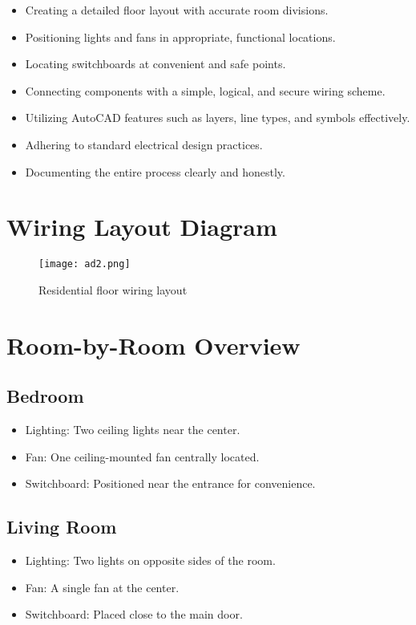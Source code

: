 \documentclass[12pt]{article}
\begin{document}
\begin{itemize}
    \item Creating a detailed floor layout with accurate room divisions.
    \item Positioning lights and fans in appropriate, functional locations.
    \item Locating switchboards at convenient and safe points.
    \item Connecting components with a simple, logical, and secure wiring scheme.
    \item Utilizing AutoCAD features such as layers, line types, and symbols effectively.
    \item Adhering to standard electrical design practices.
    \item Documenting the entire process clearly and honestly.
\end{itemize}

\newpage

\section*{Wiring Layout Diagram}
\begin{figure}[h!]
    \centering
     \texttt{[image: ad2.png]}
    \caption{Residential floor wiring layout}
    \label{fig:wiring}
\end{figure}

\section*{Room-by-Room Overview}

\subsection*{Bedroom}
\begin{itemize}
    \item Lighting: Two ceiling lights near the center.
    \item Fan: One ceiling-mounted fan centrally located.
    \item Switchboard: Positioned near the entrance for convenience.
\end{itemize}

\subsection*{Living Room}
\begin{itemize}
    \item Lighting: Two lights on opposite sides of the room.
    \item Fan: A single fan at the center.
    \item Switchboard: Placed close to the main door.
\end{itemize}
\end{document}
